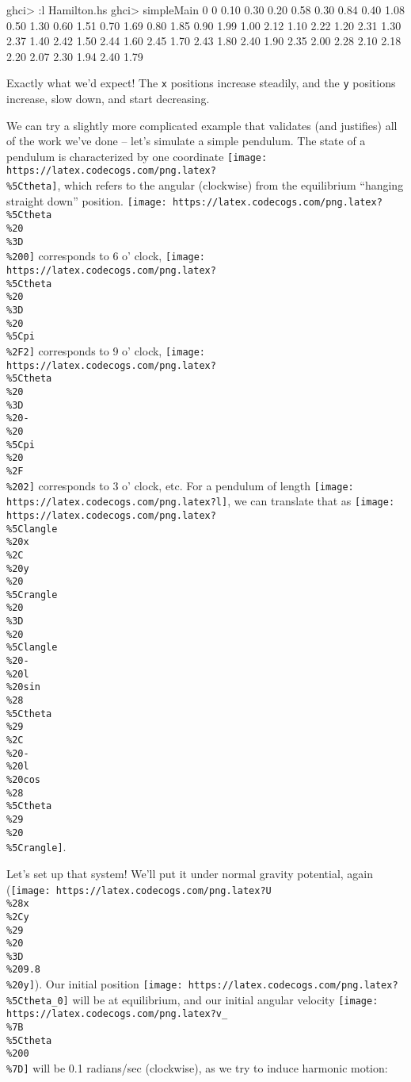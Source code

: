\documentclass[]{article}
\newenvironment{Shaded}{}{}
\newcommand{\DecValTok}[1]{\textcolor[rgb]{0.25,0.63,0.44}{#1}}
\newcommand{\FloatTok}[1]{\textcolor[rgb]{0.25,0.63,0.44}{#1}}
\newcommand{\FunctionTok}[1]{\textcolor[rgb]{0.02,0.16,0.49}{#1}}
\newcommand{\NormalTok}[1]{#1}
\begin{document}
\begin{Shaded}
\begin{Highlighting}[]
\NormalTok{ghci}\FunctionTok{>} \FunctionTok{:}\NormalTok{l Hamilton.hs}
\NormalTok{ghci}\FunctionTok{>}\NormalTok{ simpleMain}
\DecValTok{0}     \DecValTok{0}
\FloatTok{0.10}  \FloatTok{0.30}
\FloatTok{0.20}  \FloatTok{0.58}
\FloatTok{0.30}  \FloatTok{0.84}
\FloatTok{0.40}  \FloatTok{1.08}
\FloatTok{0.50}  \FloatTok{1.30}
\FloatTok{0.60}  \FloatTok{1.51}
\FloatTok{0.70}  \FloatTok{1.69}
\FloatTok{0.80}  \FloatTok{1.85}
\FloatTok{0.90}  \FloatTok{1.99}
\FloatTok{1.00}  \FloatTok{2.12}
\FloatTok{1.10}  \FloatTok{2.22}
\FloatTok{1.20}  \FloatTok{2.31}
\FloatTok{1.30}  \FloatTok{2.37}
\FloatTok{1.40}  \FloatTok{2.42}
\FloatTok{1.50}  \FloatTok{2.44}
\FloatTok{1.60}  \FloatTok{2.45}
\FloatTok{1.70}  \FloatTok{2.43}
\FloatTok{1.80}  \FloatTok{2.40}
\FloatTok{1.90}  \FloatTok{2.35}
\FloatTok{2.00}  \FloatTok{2.28}
\FloatTok{2.10}  \FloatTok{2.18}
\FloatTok{2.20}  \FloatTok{2.07}
\FloatTok{2.30}  \FloatTok{1.94}
\FloatTok{2.40}  \FloatTok{1.79}
\end{Highlighting}
\end{Shaded}

Exactly what we'd expect! The \texttt{x} positions increase steadily, and the
\texttt{y} positions increase, slow down, and start decreasing.

We can try a slightly more complicated example that validates (and justifies)
all of the work we've done -- let's simulate a simple pendulum. The state of a
pendulum is characterized by one coordinate
\texttt{[image: https://latex.codecogs.com/png.latex?\\\%5Ctheta]}, which refers
to the angular (clockwise) from the equilibrium ``hanging straight down''
position.
\texttt{[image: https://latex.codecogs.com/png.latex?\\\%5Ctheta\\\%20\\\%3D\\\%200]}
corresponds to 6 o' clock,
\texttt{[image: https://latex.codecogs.com/png.latex?\\\%5Ctheta\\\%20\\\%3D\\\%20\\\%5Cpi\\\%2F2]}
corresponds to 9 o' clock,
\texttt{[image: https://latex.codecogs.com/png.latex?\\\%5Ctheta\\\%20\\\%3D\\\%20-\\\%20\\\%5Cpi\\\%20\\\%2F\\\%202]}
corresponds to 3 o' clock, etc. For a pendulum of length
\texttt{[image: https://latex.codecogs.com/png.latex?l]}, we can translate that
as
\texttt{[image: https://latex.codecogs.com/png.latex?\\\%5Clangle\\\%20x\\\%2C\\\%20y\\\%20\\\%5Crangle\\\%20\\\%3D\\\%20\\\%5Clangle\\\%20-\\\%20l\\\%20sin\\\%28\\\%5Ctheta\\\%29\\\%2C\\\%20-\\\%20l\\\%20cos\\\%28\\\%5Ctheta\\\%29\\\%20\\\%5Crangle]}.

Let's set up that system! We'll put it under normal gravity potential, again
(\texttt{[image: https://latex.codecogs.com/png.latex?U\\\%28x\\\%2Cy\\\%29\\\%20\\\%3D\\\%209.8\\\%20y]}).
Our initial position
\texttt{[image: https://latex.codecogs.com/png.latex?\\\%5Ctheta\_0]} will be at
equilibrium, and our initial angular velocity
\texttt{[image: https://latex.codecogs.com/png.latex?v\_\\\%7B\\\%5Ctheta\\\%200\\\%7D]}
will be 0.1 radians/sec (clockwise), as we try to induce harmonic motion:
\end{document}

